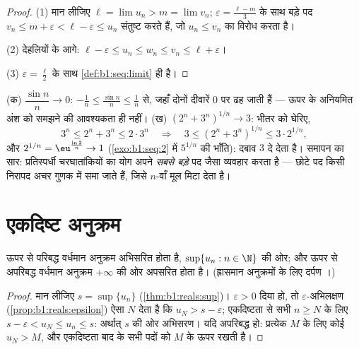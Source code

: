 \begin{proof}
(1) मान लीजिए $\ell = \lim u_n > m = \lim v_n$; $\varepsilon = \frac{\ell -
m}{3}$ के साथ बड़े पद $v_n \leq m + \varepsilon < \ell - \varepsilon \leq
u_n$ संतुष्ट करते हैं, जो $u_n \leq v_n$ का विरोध करता है।

(2) देहलियों के आगे: $\ell - \varepsilon \leq u_n \leq w_n \leq v_n \leq
\ell + \varepsilon$।

(3) $\varepsilon = \frac\ell2$ के साथ \cref{def:b1:seq:limit} ही है।
\end{proof}

\begin{example}[दो दबाव]\label{ex:b1:seq:squeezes}
(क) $\dfrac{\sin n}{n} \to 0$: $-\frac1n \leq \frac{\sin n}{n} \leq \frac1n$
से, जहाँ दोनों दीवारें $0$ पर ढह जाती हैं --- ऊपर के अनियमित अंश को समझने की
आवश्यकता ही नहीं। (ख) $(2^n + 3^n)^{1/n} \to 3$: भीतर को घेरिए,
\[
3^n \leq 2^n + 3^n \leq 2\cdot3^n
\quad\Longrightarrow\quad
3 \leq (2^n + 3^n)^{1/n} \leq 3\cdot 2^{1/n} ,
\]
और $2^{1/n} = \eu^{\frac{\ln 2}{n}} \to 1$ (\cref{exo:b1:seq:2} में
$5^{1/n}$ की भाँति): दबाव $3$ दे देता है। समापन का सार: प्रतिस्पर्धी
चरघातांकियों का योग अपने \emph{सबसे बड़े} पद जैसा व्यवहार करता है --- छोटे
पद किसी निरापद अचर गुणक में समा जाते हैं, जिसे $n$-वाँ मूल मिटा देता है।
\end{example}

\section{एकदिष्ट अनुक्रम}

\begin{theorem}[एकदिष्ट सीमा प्रमेय]\label{thm:b1:seq:monotone}
ऊपर से परिबद्ध वर्धमान अनुक्रम अभिसरित होता है, $\sup\{u_n : n \in \N\}$ की
ओर; और ऊपर से अपरिबद्ध वर्धमान अनुक्रम $+\infty$ की ओर अपसरित होता है।
(ह्रासमान अनुक्रमों के लिए दर्पण ।)
\end{theorem}

\begin{proof}
मान लीजिए $s = \sup\{u_n\}$ (\cref{thm:b1:reals:sup})। $\varepsilon > 0$
दिया हो, तो $\varepsilon$-अभिलक्षण (\cref{prop:b1:reals:epsilon}) ऐसा $N$
देता है कि $u_N > s - \varepsilon$; एकदिष्टता से सभी $n \geq N$ के लिए $s -
\varepsilon < u_N \leq u_n \leq s$: अर्थात् $s$ की ओर अभिसरण। यदि अपरिबद्ध
हो: प्रत्येक $M$ के लिए कोई $u_N > M$, और एकदिष्टता बाद के सभी पदों को $M$
के ऊपर रखती है।
\end{proof}

